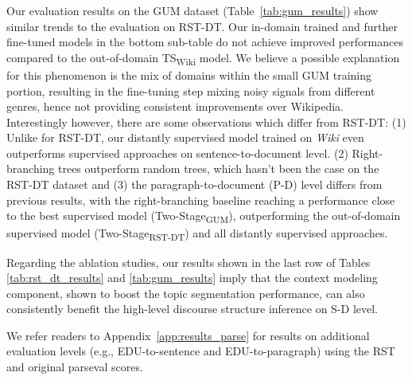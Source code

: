 \documentclass[letterpaper]{article} %
\begin{document}
Our evaluation results on the GUM dataset (Table~\ref{tab:gum_results}) show similar trends to the evaluation on RST-DT.
Our in-domain trained and further fine-tuned models in the bottom sub-table do not achieve improved performances compared to the out-of-domain TS\textsubscript{Wiki} model. We believe a possible explanation for this phenomenon is the mix of domains within the small GUM training portion, resulting in the fine-tuning step mixing noisy signals from different genres, hence not providing consistent improvements over Wikipedia. Interestingly however, there are some observations which  differ from RST-DT:
(1) Unlike for RST-DT, our distantly supervised model trained on \textit{Wiki} even outperforms supervised approaches on sentence-to-document level. (2) Right-branching trees outperform random trees, which hasn't been the case on the RST-DT dataset and (3) the paragraph-to-document (P-D) level differs from previous results, with the right-branching baseline reaching a performance close to the best supervised model (Two-Stage\textsubscript{GUM}), outperforming the out-of-domain supervised model (Two-Stage\textsubscript{RST-DT}) and all distantly supervised approaches.

Regarding the ablation studies, our results shown in the last row of Tables \ref{tab:rst_dt_results} and \ref{tab:gum_results} imply that the context modeling component, shown to boost the topic segmentation performance, can also consistently benefit the high-level discourse structure inference on S-D level.

We refer readers to Appendix~\ref{app:results_parse} for results on additional evaluation levels (e.g., EDU-to-sentence and EDU-to-paragraph) using the RST and original parseval scores.
\end{document}

